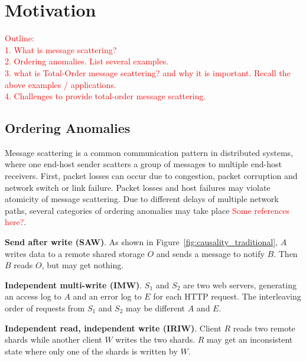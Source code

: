 \section{Motivation}
\textcolor{red}{Outline:\\
1. What is message scattering?\\
2. Ordering anomalies. List several examples.\\
3. what is Total-Order message scattering? and why it is important. Recall the above examples / applications.\\
4. Challenges to provide total-order message scattering.\\
}

\subsection{Ordering Anomalies}
\label{subsec:tso}

Message scattering is a common communication pattern in distributed systems, where one end-host sender scatters a group of messages to multiple end-host receivers. First, packet losses can occur due to congestion, packet corruption and network switch or link failure. Packet losses and host failures may violate atomicity of message scattering. Due to different delays of multiple network paths, several categories of ordering anomalies may take place \textcolor{red}{Some references here?}.

\textbf{Send after write (SAW)}.
As shown in Figure~\ref{fig:causality_traditional}, $A$ writes data to a remote shared storage $O$ and sends a message to notify $B$.
Then $B$ reads $O$, but may get nothing.


\textbf{Independent multi-write (IMW)}.
$S_1$ and $S_2$ are two web servers, generating an access log to $A$ and an error log to $E$ for each HTTP request.
The interleaving order of requests from $S_1$ and $S_2$ may be different  $A$ and $E$.

\textbf{Independent read, independent write (IRIW)}.
Client $R$ reads two remote shards while another client $W$ writes the two shards.
$R$ may get an inconsistent state where only one of the shards is written by $W$.

